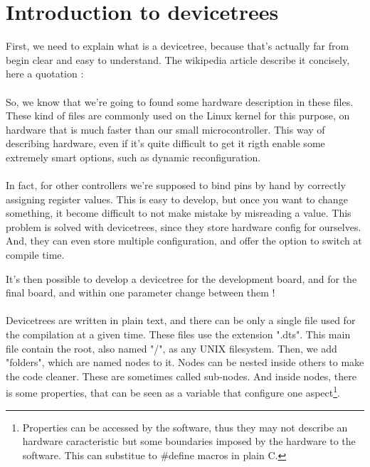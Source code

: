 \section{Introduction to devicetrees}\label{sec:dt_intro}
First, we need to explain what is a devicetree, because that's actually far
from begin clear and easy to understand. The wikipedia article describe it
concisely, here a quotation :

\begin{quote}
    \cite{devicetree}
\end{quote}

\paragraph{}
So, we know that we're going to found some hardware description in these files.
These kind of files are commonly used on the Linux kernel for this purpose, on
hardware that is much faster than our small microcontroller. This way of
describing hardware, even if it's quite difficult to get it rigth enable some
extremely smart options, such as dynamic reconfiguration.

\paragraph{}
In fact, for other controllers we're supposed to bind pins by hand by correctly
assigning register values. This is easy to develop, but once you want to change
something, it become difficult to not make mistake by misreading a value. This
problem is solved with devicetrees, since they store hardware config for
ourselves. And, they can even store multiple configuration, and offer the
option to switch at compile time.

It's then possible to develop a devicetree for the development board, and for
the final board, and within one parameter change between them !

\paragraph{}
Devicetrees are written in plain text, and there can be only a single file used
for the compilation at a given time. These files use the extension ".dts". This
main file contain the root, also named "/", as any UNIX filesystem. Then, we
add "folders", which are named nodes to it. Nodes can be nested inside others
to make the code cleaner. These are sometimes called sub-nodes. And inside
nodes, there is some properties, that can be seen as a variable that configure
one aspect\footnote{ Properties can be accessed by the software, thus they may
    not describe an hardware caracteristic but some boundaries imposed by the
    hardware to the software. This can substitue to \#define macros in plain C. }.

